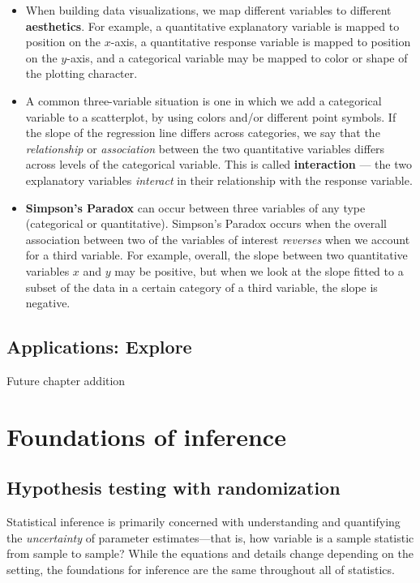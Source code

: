 \documentclass[
  10pt,
  openany]{book}
\theoremstyle{definition}
\theoremstyle{definition}
\theoremstyle{definition}
\theoremstyle{definition}
\theoremstyle{remark}
\begin{document}
\begin{itemize}
\item
  When building data visualizations, we map different variables to different \textbf{aesthetics}. For example, a quantitative explanatory variable is mapped to position on the \(x\)-axis, a quantitative response variable is mapped to position on the \(y\)-axis, and a categorical variable may be mapped to color or shape of the plotting character.
\item
  A common three-variable situation is one in which we add a categorical variable to a scatterplot, by using colors and/or different point symbols. If the slope of the regression line differs across categories, we say that the \emph{relationship} or \emph{association} between the two quantitative variables differs across levels of the categorical variable. This is called \textbf{interaction} --- the two explanatory variables \emph{interact} in their relationship with the response variable.
\item
  \textbf{Simpson's Paradox} can occur between three variables of any type (categorical or quantitative). Simpson's Paradox occurs when the overall association between two of the variables of interest \emph{reverses} when we account for a third variable. For example, overall, the slope between two quantitative variables \(x\) and \(y\) may be positive, but when we look at the slope fitted to a subset of the data in a certain category of a third variable, the slope is negative.
\end{itemize}

\chapter{Applications: Explore}\label{explore-applications}

Future chapter addition

\part{Foundations of inference}\label{part-foundations-of-inference}

\chapter{Hypothesis testing with randomization}\label{foundations-randomization}

Statistical inference is primarily concerned with understanding and quantifying the \emph{uncertainty} of parameter estimates---that is, how variable is a sample statistic from sample to sample? While the equations and details change depending on the setting, the foundations for inference are the same throughout all of statistics.
\end{document}

